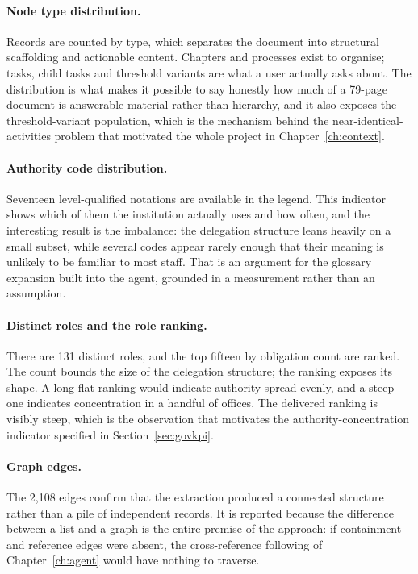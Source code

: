\paragraph{Node type distribution.} Records are counted by type, which separates the document
into structural scaffolding and actionable content. Chapters and processes exist to organise;
tasks, child tasks and threshold variants are what a user actually asks about. The
distribution is what makes it possible to say honestly how much of a 79-page document is
answerable material rather than hierarchy, and it also exposes the threshold-variant
population, which is the mechanism behind the near-identical-activities problem that motivated
the whole project in Chapter~\ref{ch:context}.

\paragraph{Authority code distribution.} Seventeen level-qualified notations are available in
the legend. This indicator shows which of them the institution actually uses and how often,
and the interesting result is the imbalance: the delegation structure leans heavily on a
small subset, while several codes appear rarely enough that their meaning is unlikely to be
familiar to most staff. That is an argument for the glossary expansion built into the agent,
grounded in a measurement rather than an assumption.

\paragraph{Distinct roles and the role ranking.} There are 131 distinct roles, and the top
fifteen by obligation count are ranked. The count bounds the size of the delegation structure;
the ranking exposes its shape. A long flat ranking would indicate authority spread evenly, and
a steep one indicates concentration in a handful of offices. The delivered ranking is visibly
steep, which is the observation that motivates the authority-concentration indicator specified
in Section~\ref{sec:govkpi}.

\paragraph{Graph edges.} The 2,108 edges confirm that the extraction produced a connected
structure rather than a pile of independent records. It is reported because the difference
between a list and a graph is the entire premise of the approach: if containment and reference
edges were absent, the cross-reference following of Chapter~\ref{ch:agent} would have nothing
to traverse.

